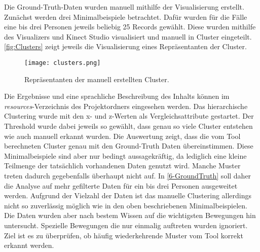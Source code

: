 Die Ground-Truth-Daten wurden manuell mithilfe der Visualisierung erstellt.
Zunächst werden drei Minimalbeispiele betrachtet.
Dafür wurden für die Fälle eine bis drei Personen jeweils beliebig 25 Records gewählt.
Diese wurden mithilfe des Visualizers und Kinect Studio visualisiert und manuell in Cluster eingeteilt.
\autoref{fig:Clusters} zeigt jeweils die Visualisierung eines Repräsentanten der Cluster.
\begin{figure}[ht]
    \begin{center}
    \texttt{[image: clusters.png]}
    \end{center}
    \caption{Repräsentanten der manuell erstellten Cluster.}
    \label{fig:Clusters}
\end{figure}
Die Ergebnisse und eine sprachliche Beschreibung des Inhalts
können im \emph{resources}-Verzeichnis des Projektordners eingesehen werden.
Das hierarchische Clustering wurde mit den x- und z-Werten als Vergleichsattribute gestartet.
Der Threshold wurde dabei jeweils so gewählt,
dass genau so viele Cluster entstehen wie auch manuell erkannt wurden.
Die Auswertung zeigt, dass die vom Tool berechneten Cluster genau mit den Ground-Truth Daten übereinstimmen.
Diese Minimalbeispiele sind aber nur bedingt aussagekräftig,
da lediglich eine kleine Teilmenge der tatsächlich vorhandenen Daten genutzt wird.
Manche Muster treten dadurch gegebenfalls überhaupt nicht auf.
In \autoref{6-GroundTruth} soll daher die Analyse auf mehr gefilterte Daten
für ein bis drei Personen ausgeweitet werden.
Aufgrund der Vielzahl der Daten ist das manuelle Clustering allerdings nicht so
zuverlässig möglich wie in den oben beschriebenen Minimalbeispielen.
Die Daten wurden aber nach bestem Wissen auf die wichtigsten Bewegungen hin untersucht.
Spezielle Bewegungen die nur einmalig auftreten wurden ignoriert.
Ziel ist es zu überprüfen,
ob häufig wiederkehrende Muster vom Tool korrekt erkannt werden.

